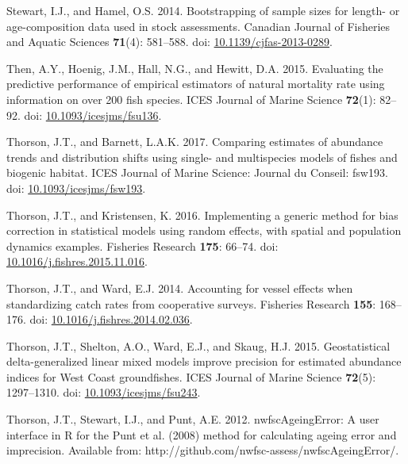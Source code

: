 \documentclass[12pt,]{article}
\begin{document}
\hypertarget{ref-stewart_bootstrapping_2014}{}
Stewart, I.J., and Hamel, O.S. 2014. Bootstrapping of sample sizes for
length- or age-composition data used in stock assessments. Canadian
Journal of Fisheries and Aquatic Sciences \textbf{71}(4): 581--588. doi:
\href{https://doi.org/10.1139/cjfas-2013-0289}{10.1139/cjfas-2013-0289}.

\hypertarget{ref-then_evaluating_2015}{}
Then, A.Y., Hoenig, J.M., Hall, N.G., and Hewitt, D.A. 2015. Evaluating
the predictive performance of empirical estimators of natural mortality
rate using information on over 200 fish species. ICES Journal of Marine
Science \textbf{72}(1): 82--92. doi:
\href{https://doi.org/10.1093/icesjms/fsu136}{10.1093/icesjms/fsu136}.

\hypertarget{ref-thorson_comparing_2017}{}
Thorson, J.T., and Barnett, L.A.K. 2017. Comparing estimates of
abundance trends and distribution shifts using single- and multispecies
models of fishes and biogenic habitat. ICES Journal of Marine Science:
Journal du Conseil: fsw193. doi:
\href{https://doi.org/10.1093/icesjms/fsw193}{10.1093/icesjms/fsw193}.

\hypertarget{ref-thorson_implementing_2016}{}
Thorson, J.T., and Kristensen, K. 2016. Implementing a generic method
for bias correction in statistical models using random effects, with
spatial and population dynamics examples. Fisheries Research
\textbf{175}: 66--74. doi:
\href{https://doi.org/10.1016/j.fishres.2015.11.016}{10.1016/j.fishres.2015.11.016}.

\hypertarget{ref-thorson_accounting_2014}{}
Thorson, J.T., and Ward, E.J. 2014. Accounting for vessel effects when
standardizing catch rates from cooperative surveys. Fisheries Research
\textbf{155}: 168--176. doi:
\href{https://doi.org/10.1016/j.fishres.2014.02.036}{10.1016/j.fishres.2014.02.036}.

\hypertarget{ref-thorson_geostatistical_2015}{}
Thorson, J.T., Shelton, A.O., Ward, E.J., and Skaug, H.J. 2015.
Geostatistical delta-generalized linear mixed models improve precision
for estimated abundance indices for West Coast groundfishes. ICES
Journal of Marine Science \textbf{72}(5): 1297--1310. doi:
\href{https://doi.org/10.1093/icesjms/fsu243}{10.1093/icesjms/fsu243}.

\hypertarget{ref-thorson_nwfscageingerror:_2012}{}
Thorson, J.T., Stewart, I.J., and Punt, A.E. 2012. nwfscAgeingError: A
user interface in R for the Punt et al. (2008) method for calculating
ageing error and imprecision. Available from:
http://github.com/nwfsc-assess/nwfscAgeingError/.
\end{document}
